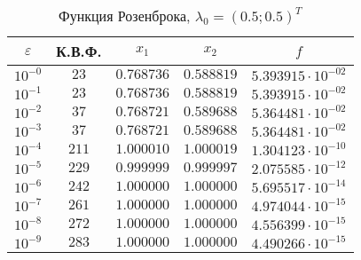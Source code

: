 \documentclass[a4paper,12pt,notitlepage,pdftex,headsepline]{scrartcl}
\begin{document}
        \begin{table}[ht]
          \centering
          \caption{Функция Розенброка, $\lambda_0 = (0.5; 0.5)^T$}
          \begin{tabular}{|c|c|c|c|c|}
            \hline
            $\varepsilon$ & К.В.Ф. & $x_1$ & $x_2$ & $f$\\
            \hline
             $10^{-0}$ & $23$ & $0.768736$ & $0.588819$ & $5.393915\cdot 10^{-02}$\\
             $10^{-1}$ & $23$ & $0.768736$ & $0.588819$ & $5.393915\cdot 10^{-02}$\\
             $10^{-2}$ & $37$ & $0.768721$ & $0.589688$ & $5.364481\cdot 10^{-02}$\\
             $10^{-3}$ & $37$ & $0.768721$ & $0.589688$ & $5.364481\cdot 10^{-02}$\\
             $10^{-4}$ & $211$ & $1.000010$ & $1.000019$ & $1.304123\cdot 10^{-10}$\\
             $10^{-5}$ & $229$ & $0.999999$ & $0.999997$ & $2.075585\cdot 10^{-12}$\\
             $10^{-6}$ & $242$ & $1.000000$ & $1.000000$ & $5.695517\cdot 10^{-14}$\\
             $10^{-7}$ & $261$ & $1.000000$ & $1.000000$ & $4.974044\cdot 10^{-15}$\\
             $10^{-8}$ & $272$ & $1.000000$ & $1.000000$ & $4.556399\cdot 10^{-15}$\\
             $10^{-9}$ & $283$ & $1.000000$ & $1.000000$ & $4.490266\cdot 10^{-15}$\\
            \hline
          \end{tabular}
        \end{table}
\end{document}

